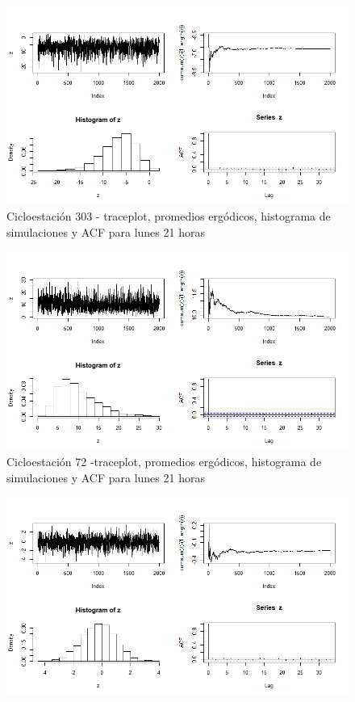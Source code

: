 \documentclass[9pt,twocolumn,twoside]{ilcss}
\begin{document}
\begin{appendices}
\begin{figure}[tbhp]
	\centering
	\includegraphics[width=0.9\linewidth]{Paper/images/303_diahora_7_21.png}
	\caption{ Cicloestación 303 - traceplot, promedios ergódicos, histograma de simulaciones y ACF para lunes 21 horas}
	\label{fig:pen_habs_penbc303_diahora}
\end{figure}
\begin{figure}[tbhp]
	\centering
	\includegraphics[width=0.9\linewidth]{Paper/images/72_diahora_7_21.png}
	\caption{ Cicloestación 72 -traceplot, promedios ergódicos, histograma de simulaciones y ACF para lunes 21 horas}
	\label{fig:pen_habs_penb72_diahora}
\end{figure}
\begin{figure}[tbhp]
	\centering
	\includegraphics[width=0.9\linewidth]{Paper/images/271_diahora_7_21.png}

\end{figure}
\end{appendices}
\end{document}
